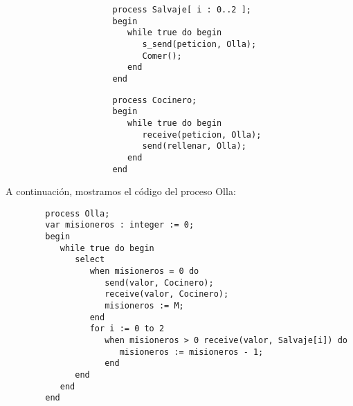 \begin{ejercicio}
\begin{figure}[H]
        \centering
        \setlength{\columnsep}{1cm}
        \begin{multicols}{2}
            \begin{verbatim}
                process Salvaje[ i : 0..2 ];
                begin
                   while true do begin
                      s_send(peticion, Olla);
                      Comer();
                   end
                end
            \end{verbatim}
            \begin{verbatim}
                process Cocinero;
                begin
                   while true do begin
                      receive(peticion, Olla);
                      send(rellenar, Olla);
                   end
                end
            \end{verbatim}
        \end{multicols}
    \end{figure}
    A continuación, mostramos el código del proceso Olla:
    \begin{verbatim}
        process Olla;
        var misioneros : integer := 0;
        begin
           while true do begin
              select 
                 when misioneros = 0 do
                    send(valor, Cocinero);
                    receive(valor, Cocinero);
                    misioneros := M;
                 end
                 for i := 0 to 2 
                    when misioneros > 0 receive(valor, Salvaje[i]) do
                       misioneros := misioneros - 1;
                    end
              end
           end
        end
    \end{verbatim}
\end{ejercicio}

